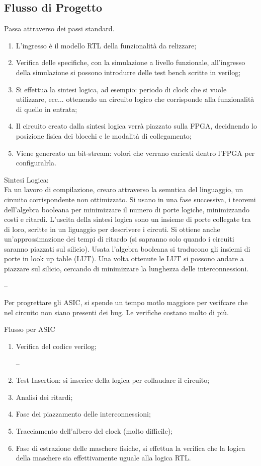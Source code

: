 \documentclass[12pt]{article}
\begin{document}
\subsection{Flusso di Progetto}
Passa attraverso dei passi standard. 
\begin{enumerate}
    \item L'ingresso \`e il modello RTL della funzionalit\`a da relizzare;
    \item Verifica delle specifiche, con la simulazione a livello funzionale, all'ingresso della simulazione si possono introdurre delle test bench scritte in verilog;
    \item Si effettua la sintesi logica, ad esempio: periodo di clock che si vuole utilizzare, ecc... ottenendo un circuito logico che corrisponde alla funzionalit\`a di quello in entrata;
    \item Il circuito creato dalla sintesi logica verr\`a piazzato sulla FPGA, decidnendo lo posizione fisica dei blocchi e le modalit\`a di collegamento;
    \item Viene genereato un bit-stream: volori che verrano caricati dentro l'FPGA per configuralrla.
\end{enumerate}

Sintesi Logica: \\
Fa un lavoro di compilazione, crearo attraverso la semntica del linguaggio, un circuito corrispondente non ottimizzato. Si usano in una fase successiva, i teoremi dell'algebra booleana per minimizzare il numero di porte logiche, minimizzando costi e ritardi. L'uscita della sintesi logica sono un insieme di porte collegate tra di loro, scritte in un liguaggio per descrivere i circuti. Si ottiene anche un'approssimazione dei tempi di ritardo (si sapranno solo quando i circuiti saranno piazzati sul silicio). Usata l'algebra booleana si traducono gli insiemi di porte in look up table (LUT). Una volta ottenute le LUT si possono andare a piazzare sul silicio, cercando di minimizzare la lunghezza delle interconnessioni.

--

Per progrettare gli ASIC, si spende un tempo motlo maggiore per verifcare che nel circuito non siano presenti dei bug. Le verifiche costano molto di pi\`u.

Flusso per ASIC
\begin{enumerate}
    \item Verifica del codice verilog;

        --

    \item Test Insertion: si inserice della logica per collaudare il circuito;
    \item Analisi dei ritardi;
    \item Fase dei piazzamento delle interconnessioni;
    \item Tracciamento dell'albero del clock (molto difficile);
    \item Fase di estrazione delle maschere fisiche, si effettua la verifica che la logica della maschere sia effettivamente uguale alla logica RTL.
\end{enumerate}
\end{document}
